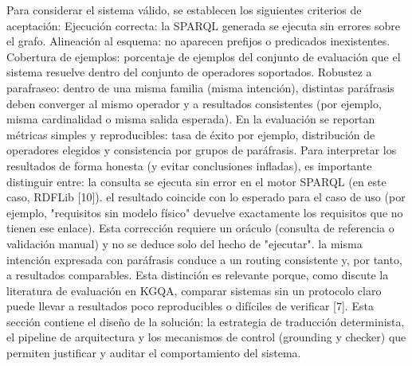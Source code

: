 {}Para considerar el sistema válido, se establecen los siguientes criterios de aceptación:\markdownRendererInterblockSeparator
{}\markdownRendererUlBeginTight
\markdownRendererUlItem Ejecución correcta: la SPARQL generada se ejecuta sin errores sobre el grafo.\markdownRendererUlItemEnd 
\markdownRendererUlItem Alineación al esquema: no aparecen prefijos o predicados inexistentes.\markdownRendererUlItemEnd 
\markdownRendererUlItem Cobertura de ejemplos: porcentaje de ejemplos del conjunto de evaluación que el sistema resuelve dentro del conjunto de operadores soportados.\markdownRendererUlItemEnd 
\markdownRendererUlItem Robustez a parafraseo: dentro de una misma familia (misma intención), distintas paráfrasis deben converger al mismo operador y a resultados consistentes (por ejemplo, misma cardinalidad o misma salida esperada).\markdownRendererUlItemEnd 
\markdownRendererUlEndTight \markdownRendererInterblockSeparator
{}En la evaluación se reportan métricas simples y reproducibles: tasa de éxito por ejemplo, distribución de operadores elegidos y consistencia por grupos de paráfrasis.\markdownRendererInterblockSeparator
{}Para interpretar los resultados de forma honesta (y evitar conclusiones infladas), es importante distinguir entre:\markdownRendererInterblockSeparator
{}\markdownRendererUlBeginTight
\markdownRendererUlItem {} la consulta se ejecuta sin error en el motor SPARQL (en este caso, RDFLib [10]).\markdownRendererUlItemEnd 
\markdownRendererUlItem {} el resultado coincide con lo esperado para el caso de uso (por ejemplo, "requisitos sin modelo físico" devuelve exactamente los requisitos que no tienen ese enlace). Esta corrección requiere un oráculo (consulta de referencia o validación manual) y no se deduce solo del hecho de "ejecutar".\markdownRendererUlItemEnd 
\markdownRendererUlItem {} la misma intención expresada con paráfrasis conduce a un routing consistente y, por tanto, a resultados comparables.\markdownRendererUlItemEnd 
\markdownRendererUlEndTight \markdownRendererInterblockSeparator
{}Esta distinción es relevante porque, como discute la literatura de evaluación en KGQA, comparar sistemas sin un protocolo claro puede llevar a resultados poco reproducibles o difíciles de verificar [7].\markdownRendererInterblockSeparator
{}\markdownRendererHorizontalRule{}\markdownRendererInterblockSeparator
{}\markdownRendererInterblockSeparator
{}Esta sección contiene el diseño de la solución: la estrategia de traducción determinista, el pipeline de arquitectura y los mecanismos de control (grounding y checker) que permiten justificar y auditar el comportamiento del sistema.\markdownRendererInterblockSeparator
